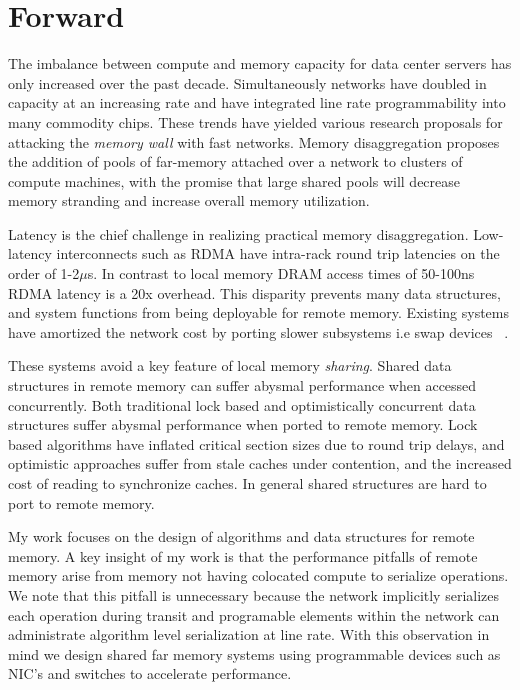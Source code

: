 
\section{Forward}

The imbalance between compute and memory capacity for data
center servers has only increased over the past decade.
Simultaneously networks have doubled in capacity at an
increasing rate and have integrated line rate
programmability into many commodity chips. These trends have
yielded various research proposals for attacking the
\textit{memory wall} with fast networks. Memory
disaggregation proposes the addition of pools of far-memory
attached over a network to clusters of compute machines,
with the promise that large shared pools will decrease
memory stranding and increase overall memory utilization.

Latency is the chief challenge in realizing practical memory
disaggregation. Low-latency interconnects such as RDMA have
intra-rack round trip latencies on the order of 1-2$\mu$s.
In contrast to local memory DRAM access times of 50-100ns
RDMA latency is a 20x overhead. This disparity prevents many
data structures, and system functions from being deployable
for remote memory. Existing systems have amortized the
network cost by porting slower subsystems i.e swap devices
~\cite{fastswap, legoos}. 

These systems avoid a key feature of local memory
\textit{sharing}. Shared data structures in remote memory
can suffer abysmal performance when accessed concurrently.
Both traditional lock based and optimistically concurrent
data structures suffer abysmal performance when ported to
remote memory. Lock based algorithms have inflated critical
section sizes due to round trip delays, and optimistic
approaches suffer from stale caches under contention, and
the increased cost of reading to synchronize caches. In
general shared structures are hard to port to remote memory.

My work focuses on the design of algorithms and data
structures for remote memory.  A key insight of my work is
that the performance pitfalls of remote memory arise from
memory not having colocated compute to serialize operations.
We note that this pitfall is unnecessary because the network
implicitly serializes each operation during transit and
programable elements within the network can administrate
algorithm level serialization at line rate. With this
observation in mind we design shared far memory systems
using programmable devices such as NIC's and switches to
accelerate performance.

